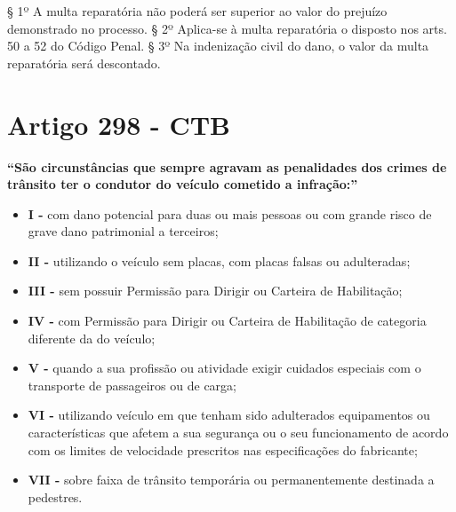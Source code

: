 \documentclass[
  letterpaper,
  DIV=11,
  numbers=noendperiod]{scrreport}
\begin{document}
§ 1º A multa reparatória não poderá ser superior ao valor do prejuízo
demonstrado no processo. § 2º Aplica-se à multa reparatória o disposto
nos arts. 50 a 52 do Código Penal. § 3º Na indenização civil do dano, o
valor da multa reparatória será descontado.

\hypertarget{artigo-298---ctb}{%
\section{\texorpdfstring{\textbf{Artigo 298 -
CTB}}{Artigo 298 - CTB}}\label{artigo-298---ctb}}

\begin{tcolorbox}[enhanced jigsaw, titlerule=0mm, colframe=quarto-callout-important-color-frame, opacityback=0, breakable, colbacktitle=quarto-callout-important-color!10!white, left=2mm, bottomtitle=1mm, toprule=.15mm, rightrule=.15mm, arc=.35mm, leftrule=.75mm, bottomrule=.15mm, opacitybacktitle=0.6, toptitle=1mm, title=\textcolor{quarto-callout-important-color}{\faExclamation}\hspace{0.5em}{Important}, colback=white, coltitle=black]

\textbf{``São circunstâncias que sempre agravam as penalidades dos
crimes de trânsito ter o condutor do veículo cometido a infração:''}

\end{tcolorbox}

\begin{itemize}
\item
  \textbf{I -} com dano potencial para duas ou mais pessoas ou com
  grande risco de grave dano patrimonial a terceiros;
\item
  \textbf{II -} utilizando o veículo sem placas, com placas falsas ou
  adulteradas;
\item
  \textbf{III -} sem possuir Permissão para Dirigir ou Carteira de
  Habilitação;
\item
  \textbf{IV -} com Permissão para Dirigir ou Carteira de Habilitação de
  categoria diferente da do veículo;
\item
  \textbf{V -} quando a sua profissão ou atividade exigir cuidados
  especiais com o transporte de passageiros ou de carga;
\item
  \textbf{VI -} utilizando veículo em que tenham sido adulterados
  equipamentos ou características que afetem a sua segurança ou o seu
  funcionamento de acordo com os limites de velocidade prescritos nas
  especificações do fabricante;
\item
  \textbf{VII -} sobre faixa de trânsito temporária ou permanentemente
  destinada a pedestres.
\end{itemize}
\end{document}

